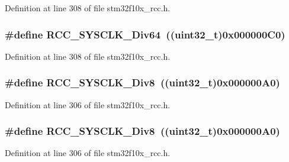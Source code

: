 Definition at line 308 of file stm32f10x\+\_\+rcc.\+h.

\subsubsection[{\texorpdfstring{R\+C\+C\+\_\+\+S\+Y\+S\+C\+L\+K\+\_\+\+Div64}{RCC_SYSCLK_Div64}}]{\setlength{\rightskip}{0pt plus 5cm}\#define R\+C\+C\+\_\+\+S\+Y\+S\+C\+L\+K\+\_\+\+Div64~(({\bf uint32\+\_\+t})0x000000\+C0)}\hypertarget{group___a_h_b__clock__source_gab6a2c2d4e945c607259988a9b6df26e5}{}\label{group___a_h_b__clock__source_gab6a2c2d4e945c607259988a9b6df26e5}


Definition at line 308 of file stm32f10x\+\_\+rcc.\+h.

\subsubsection[{\texorpdfstring{R\+C\+C\+\_\+\+S\+Y\+S\+C\+L\+K\+\_\+\+Div8}{RCC_SYSCLK_Div8}}]{\setlength{\rightskip}{0pt plus 5cm}\#define R\+C\+C\+\_\+\+S\+Y\+S\+C\+L\+K\+\_\+\+Div8~(({\bf uint32\+\_\+t})0x000000\+A0)}\hypertarget{group___a_h_b__clock__source_gade72fe3aca89f3e8c4fe8692ea217912}{}\label{group___a_h_b__clock__source_gade72fe3aca89f3e8c4fe8692ea217912}


Definition at line 306 of file stm32f10x\+\_\+rcc.\+h.

\subsubsection[{\texorpdfstring{R\+C\+C\+\_\+\+S\+Y\+S\+C\+L\+K\+\_\+\+Div8}{RCC_SYSCLK_Div8}}]{\setlength{\rightskip}{0pt plus 5cm}\#define R\+C\+C\+\_\+\+S\+Y\+S\+C\+L\+K\+\_\+\+Div8~(({\bf uint32\+\_\+t})0x000000\+A0)}\hypertarget{group___a_h_b__clock__source_gade72fe3aca89f3e8c4fe8692ea217912}{}\label{group___a_h_b__clock__source_gade72fe3aca89f3e8c4fe8692ea217912}


Definition at line 306 of file stm32f10x\+\_\+rcc.\+h.

